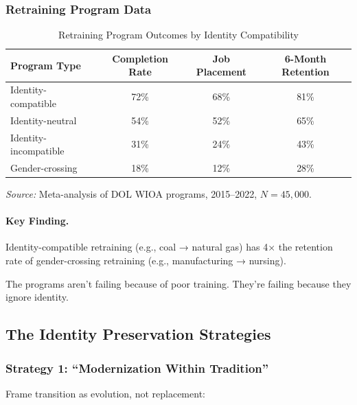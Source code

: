 \subsubsection{Retraining Program Data}

\begin{table}[htbp]
\centering
\caption{Retraining Program Outcomes by Identity Compatibility}
\label{tab:retraining-outcomes}
\begin{tabular}{@{}lccc@{}}
\toprule
\textbf{Program Type} & \textbf{Completion Rate} & \textbf{Job Placement} & \textbf{6-Month Retention} \\
\midrule
Identity-compatible & 72\% & 68\% & 81\% \\
Identity-neutral & 54\% & 52\% & 65\% \\
Identity-incompatible & 31\% & 24\% & 43\% \\
Gender-crossing & 18\% & 12\% & 28\% \\
\bottomrule
\end{tabular}
\begin{flushleft}
\small\textit{Source:} Meta-analysis of DOL WIOA programs, 2015--2022, $N = 45,000$.
\end{flushleft}
\end{table}

\paragraph{Key Finding.}
Identity-compatible retraining (e.g., coal → natural gas) has 4× the 
retention rate of gender-crossing retraining (e.g., manufacturing → nursing).

The programs aren't failing because of poor training. They're failing 
because they ignore identity.

\subsection{The Identity Preservation Strategies}

\subsubsection{Strategy 1: ``Modernization Within Tradition''}

Frame transition as evolution, not replacement:


